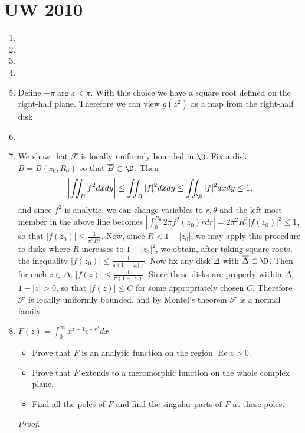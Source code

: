 \documentclass[11pt]{book}
\theoremstyle{definition}
\renewcommand{\Re}{\operatorname{Re}}
\begin{document}
\section{UW 2010}
\begin{enumerate}
\item
\item
\item
\item
\item Define $-\pi \arg z < \pi$. With this choice we have a square root defined on the right-half plane. Therefore we can view $g(z^2)$ as a map from the right-half disk 
\item
\item We show that $\mathcal{F}$ is locally uniformly bounded in $\D$. Fix a disk $B=B(z_0,R_0)$ so that $\overline{B}\subset\D$. Then 
\[
\left|\iint_{B}f^2 dxdy\right|\leq \iint_{B} |f|^2 dxdy\leq \iint_{\D} |f|^2dxdy\leq 1,
\]
and since $f^2$ is analytic, we can change variables to $r,\theta$ and the left-most member in the above line becomes $\left|\int_{0}^{R_0} 2\pi f^2(z_0)rdr\right|=2\pi^2R_0^2|f(z_0)|^2\leq1$, so that $|f(z_0)|\leq \frac{1}{\pi^2R^2}$. Now, since $R<1-|z_0|$, we may apply this procedure to disks where $R$ increases to $1-|z_0|^2$, we obtain, after taking square roots, the inequality $|f(z_0)|\leq \frac{1}{\pi(1-|z_0|)}$. Now fix any disk $\Delta$ with $\overline\Delta\subset\D$. Then for each $z\in\Delta$, $|f(z)|\leq\frac{1}{\pi(1-|z|)}$. Since these disks are properly within $\Delta$, $1-|z|>0$, so that $|f(z)|\leq C$ for some appropriately chosen $C$. Therefore $\mathcal{F}$ is locally uniformly bounded, and by Montel's theorem $\mathcal{F}$ is a normal family.
\item
$F(z)=\int_0^{\infty} x^{z-1}e^{-x^2}dx$.
\begin{itemize}
\item Prove that $F$ is an analytic function on the region $\Re z>0$.
\item Prove that $F$ extends to a meromorphic function on the whole complex plane.
\item Find all the poles of $F$ and find the singular parts of $F$ at these poles.
\end{itemize}
\begin{proof}

\end{proof}
\end{enumerate}
\end{document}
